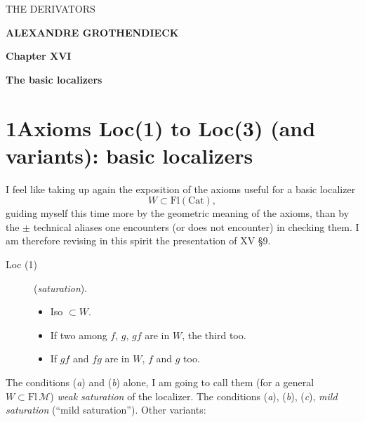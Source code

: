\documentclass[11pt]{article}
\newcommand{\printedpage}[1]{\marginpar{\footnotesize p.~#1}}
\newcommand{\msp}[1]{\marginpar{\footnotesize [#1]}}
\newcommand{\Cat}{\mathrm{Cat}}
\begin{document}
\printedpage{[unnumbered]}

\begin{center}
{\sffamily\LARGE THE DERIVATORS}

\bigskip

{\large\textbf{ALEXANDRE GROTHENDIECK}}

\vspace{3em}

{\large\textbf{Chapter XVI}}

\medskip

{\large\textbf{The basic localizers}}
\end{center}

\clearpage


\printedpage{1}

\msp{page 1}

\section*{1\quad Axioms Loc(1) to Loc(3) (and variants): basic localizers}

I feel like taking up again the exposition of the axioms useful for a basic localizer
\[
W \subset \mathrm{Fl}(\Cat),
\]
guiding myself this time more by the geometric meaning of the axioms, than by the $\pm$ technical aliases one encounters (or does not encounter) in checking them. I am therefore revising in this spirit the presentation of XV §9.

\begin{description}
\item[Loc (1)] (\textit{saturation}).
\begin{itemize}
\item[\textit{a})] Iso $\subset W$.
\item[\textit{b})] If two among $f$, $g$, $gf$ are in $W$, the third too.
\item[\textit{c})] If $gf$ and $fg$ are in $W$, $f$ and $g$ too.
\end{itemize}
\end{description}

The conditions (\textit{a}) and (\textit{b}) alone, I am going to call them (for a general $W \subset \mathrm{Fl}\,\mathcal{M}$) \textit{weak saturation} of the localizer. The conditions (\textit{a}), (\textit{b}), (\textit{c}), \textit{mild saturation} (``mild saturation''). Other variants:
\end{document}
